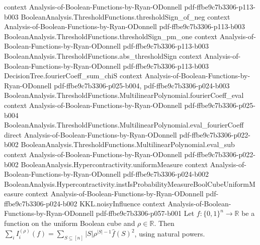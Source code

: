 \begin{lemma}
  {context}
  {Analysis-of-Boolean-Functions-by-Ryan-ODonnell}
  {pdf-ffbe9c7b3306-p113-b003}
\proofstep
  {BooleanAnalysis.ThresholdFunctions.thresholdSign_of_neg}
  {context}
  {Analysis-of-Boolean-Functions-by-Ryan-ODonnell}
  {pdf-ffbe9c7b3306-p113-b003}
\proofstep
  {BooleanAnalysis.ThresholdFunctions.thresholdSign_pm_one}
  {context}
  {Analysis-of-Boolean-Functions-by-Ryan-ODonnell}
  {pdf-ffbe9c7b3306-p113-b003}
\proofstep
  {BooleanAnalysis.ThresholdFunctions.abs_thresholdSign}
  {context}
  {Analysis-of-Boolean-Functions-by-Ryan-ODonnell}
  {pdf-ffbe9c7b3306-p113-b003}
\proofstep
  {DecisionTree.fourierCoeff_sum_chiS}
  {context}
  {Analysis-of-Boolean-Functions-by-Ryan-ODonnell}
  {pdf-ffbe9c7b3306-p025-b004,
    pdf-ffbe9c7b3306-p024-b003}
\proofstep
  {BooleanAnalysis.ThresholdFunctions.MultilinearPolynomial.fourierCoeff_eval}
  {context}
  {Analysis-of-Boolean-Functions-by-Ryan-ODonnell}
  {pdf-ffbe9c7b3306-p025-b004}
\proofstep
  {BooleanAnalysis.ThresholdFunctions.MultilinearPolynomial.eval_fourierCoeff}
  {direct}
  {Analysis-of-Boolean-Functions-by-Ryan-ODonnell}
  {pdf-ffbe9c7b3306-p022-b002}
\proofstep
  {BooleanAnalysis.ThresholdFunctions.MultilinearPolynomial.eval_sub}
  {context}
  {Analysis-of-Boolean-Functions-by-Ryan-ODonnell}
  {pdf-ffbe9c7b3306-p022-b002}
\proofstep
  {BooleanAnalysis.Hypercontractivity.uniformMeasure}
  {context}
  {Analysis-of-Boolean-Functions-by-Ryan-ODonnell}
  {pdf-ffbe9c7b3306-p024-b002}
\proofstep
  {BooleanAnalysis.Hypercontractivity.instIsProbabilityMeasureBoolCubeUniformMeasure}
  {context}
  {Analysis-of-Boolean-Functions-by-Ryan-ODonnell}
  {pdf-ffbe9c7b3306-p024-b002}
\proofstep
  {KKL.noisyInfluence}
  {context}
  {Analysis-of-Boolean-Functions-by-Ryan-ODonnell}
  {pdf-ffbe9c7b3306-p057-b001}
\label{KKL.sum_noisyInfluence}
Let $f:\{0,1\}^n\to\mathbb R$ be a function on the uniform Boolean cube and
$\rho\in\mathbb R$. Then
$\sum_iI_i^{(\rho)}(f)=\sum_{S\subseteq[n]}|S|\rho^{|S|-1}\widehat f(S)^2$, using
natural powers.
\end{lemma}

